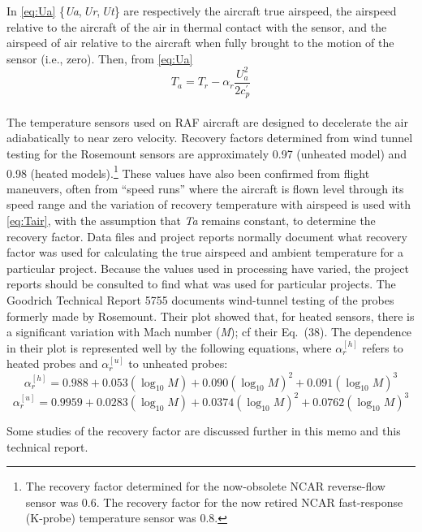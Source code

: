\documentclass[
]{book}
\begin{document}
In \eqref{eq:Ua} {\{\emph{U}\emph{a}, \emph{U}\emph{r}, \emph{U}\emph{t}\}} are respectively the aircraft true airspeed, the airspeed relative to the aircraft of the air in thermal contact with the sensor, and the airspeed of air relative to the aircraft when fully brought to the motion of the sensor (i.e., zero). Then, from \eqref{eq:Ua} \begin{equation}
T_{a}=T_{r}-\alpha_{r}\frac{U_{a}^{2}}{2c_{p}^{\prime}}
\label{eq:Tair}
\end{equation}\\
The temperature sensors used on RAF aircraft are designed to decelerate the air adiabatically to near zero velocity. Recovery factors determined from wind tunnel testing for the Rosemount sensors are approximately 0.97 (unheated model) and 0.98 (heated models).\footnote{The recovery factor determined for the now-obsolete NCAR reverse-flow sensor was 0.6. The recovery factor for the now retired NCAR fast-response (K-probe) temperature sensor was 0.8.}
These values have also been confirmed from flight maneuvers, often from ``speed runs'' where the aircraft is flown level through its speed range and the variation of recovery temperature with airspeed is used with \eqref{eq:Tair}, with the assumption that {\emph{T}\emph{a}} remains constant, to determine the recovery factor. Data files and project reports normally document what recovery factor was used for calculating the true airspeed and ambient temperature for a particular project.
Because the values used in processing have varied, the project reports should be consulted to find what was used for particular projects. The Goodrich Technical Report 5755 documents wind-tunnel testing of the probes formerly made by Rosemount. Their plot showed that, for heated sensors, there is a significant variation with Mach number ({\emph{M}}); cf their Eq.~(38). The dependence in their plot is represented well by the following equations, where \(\alpha_r^{[h]}\) refers to heated probes and \(\alpha_r^{[u]}\) to unheated probes:\\
\begin{equation}
\alpha_r^{[h]} = 0.988+0.053(\log_{10}M)+0.090(\log_{10}M)^2+0.091(\log_{10}M)^3
\label{eq:alphah}
\end{equation}
\begin{equation}
\alpha_r^{[u]}=0.9959+0.0283(\log_{10}M)+0.0374(\log_{10}M)^2+0.0762(\log_{10}M)^3
\label{eq:alphau}
\end{equation}

Some studies of the recovery factor are discussed further in this memo and this technical report.
\end{document}
